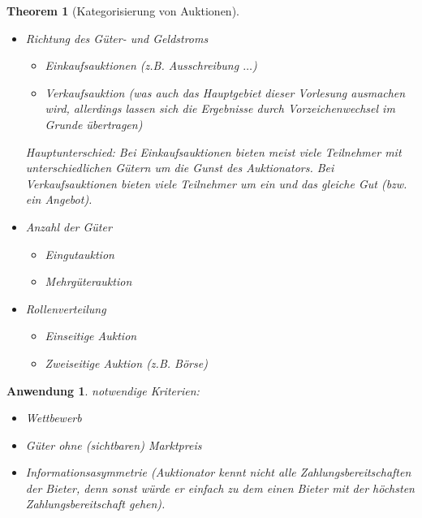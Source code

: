 \documentclass[12pt]{extreport} %
\theoremstyle{named}
\newtheorem*{unnamedtheorem*}{Theorem}
\theoremstyle{itshape}
\theoremstyle{normal}
\newtheorem{anwendung}[unnamedtheorem]{Anwendung}
\begin{document}
\begin{unnamedtheorem*}[Kategorisierung von Auktionen] ~\
	\begin{itemize}
		\item Richtung des Güter- und Geldstroms
			\begin{itemize}
				\item Einkaufsauktionen (z.B. Ausschreibung $\dotsc$)
				\item Verkaufsauktion (was auch das Hauptgebiet dieser Vorlesung ausmachen wird, allerdings lassen sich die Ergebnisse durch Vorzeichenwechsel im Grunde übertragen)
			\end{itemize}
			Hauptunterschied: Bei Einkaufsauktionen bieten meist viele Teilnehmer mit unterschiedlichen Gütern um die Gunst des Auktionators.
			Bei Verkaufsauktionen bieten viele Teilnehmer um ein und das gleiche Gut (bzw. ein Angebot).
		\item Anzahl der Güter
			\begin{itemize}
				\item Eingutauktion
				\item Mehrgüterauktion
			\end{itemize}
		\item Rollenverteilung
			\begin{itemize}
				\item Einseitige Auktion
				\item Zweiseitige Auktion (z.B. Börse)
			\end{itemize}
	\end{itemize}
\end{unnamedtheorem*}

\begin{anwendung}
	notwendige Kriterien:
	\begin{itemize}
		\item Wettbewerb
		\item Güter ohne (sichtbaren) Marktpreis
		\item Informationsasymmetrie (Auktionator kennt nicht alle Zahlungsbereitschaften der Bieter, denn sonst würde er einfach zu dem einen Bieter mit der höchsten Zahlungsbereitschaft gehen).
	\end{itemize}
\end{anwendung}

\newpage
\end{document}
